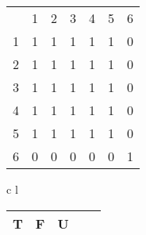 \documentclass{article}
\newcommand{\RowColor}{\rowcolor{red!50} \cellcolor{white}}
\begin{document}
\begin{tabular}{l || l l l l l | l}
                  & 1 & 2 & 3 & 4 & 5 & \cellcolor{yellow}6 \\\hhline{=#=====|=}
\RowColor       1 & 1 & 1 & 1 & 1 & 1 & \cellcolor{white}0  \\
\RowColor       2 & 1 & 1 & 1 & 1 & 1 & \cellcolor{white}0  \\
\RowColor       3 & 1 & 1 & 1 & 1 & 1 & \cellcolor{white}0  \\
\RowColor       4 & 1 & 1 & 1 & 1 & 1 & \cellcolor{white}0  \\
\RowColor       5 & 1 & 1 & 1 & 1 & 1 & \cellcolor{white}0  \\\hline
\cellcolor{cyan}6 & 0 & 0 & 0 & 0 & 0 & \cellcolor{green}1
\end{tabular}



    \begin{tabular}{c l}

        
        \setlength\arrayrulewidth{1pt}
        \begin{tabular}{|l |c| l| c| c|}
            \RowColor \cellcolor{green}T & F & \cellcolor{green} U\\
            \hline
        \end{tabular}
    \end{tabular}
\end{document}
